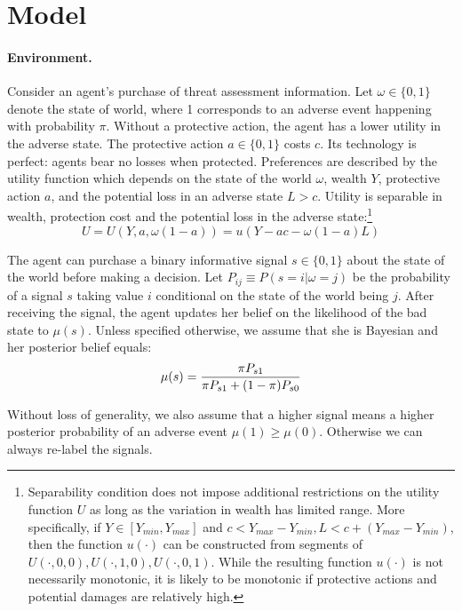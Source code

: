 \documentclass[12pt,a4paper]{article}
\begin{document}
\vspace{20pt}

\section{Model}
\paragraph{Environment.} Consider an agent's purchase of threat assessment information. Let $\omega \in \{0,1\}$ denote the state of world, where 1 corresponds to an adverse event happening with probability $\pi$. Without a protective action, the agent has a lower utility in the adverse state. The protective action $a\in\{0,1\}$ costs $c$. Its technology is perfect: agents bear no losses when protected. Preferences are described by the utility function which depends on the state of the world $\omega$, wealth $Y$, protective action $a$, and the potential loss in an adverse state $L > c$. Utility is separable in wealth, protection cost and the potential loss in the adverse state:\footnote{Separability condition does not impose additional restrictions on the utility function $U$ as long as the variation in wealth has limited range. More specifically, if $Y \in [Y_{min},Y_{max}]$ and $c<Y_{max}-Y_{min}, L<c+(Y_{max}-Y_{min})$, then the function $u(\cdot)$ can be constructed from segments of $U(\cdot,0,0), U(\cdot,1,0), U(\cdot,0,1)$.  While the resulting function $u(\cdot)$ is not necessarily monotonic, it is likely to be monotonic if protective actions and potential damages are relatively high.}
\begin{equation}
U=U(Y,a,\omega(1-a))=u(Y-ac-\omega(1-a)L)
\end{equation}

The agent can purchase a binary informative signal $s\in\{0,1\}$ about the state of the world before making a decision. Let $P_{ij}\equiv P(s=i|\omega=j)$ be the probability of a signal $s$ taking value $i$ conditional on the state of the world being $j$.  After receiving the signal, the agent updates her belief on the likelihood of the bad state to $\mu(s)$. Unless specified otherwise, we assume that she is Bayesian and her posterior belief equals:
\begin{equation}
\mu(s)= {\pi P_{s1} \over \pi P_{s1}+(1-\pi)P_{s0}}
\end{equation}

Without loss of generality, we also assume that a higher signal means a higher posterior probability of an adverse event $\mu(1)\geq\mu(0)$. Otherwise we can always re-label the signals.
\end{document}
